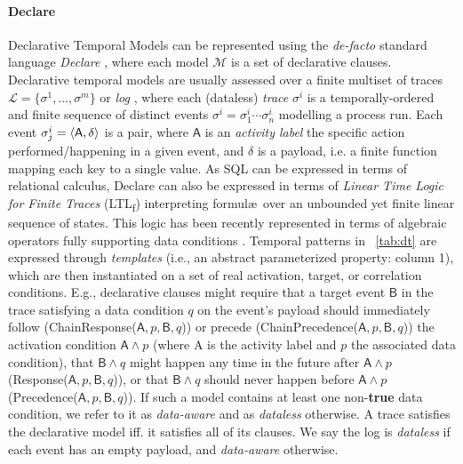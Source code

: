 \documentclass[acmengage]{acmart}
\newcommand{\LTLf}{\textup{LTL}\textsubscript{f}\xspace}
\begin{document}
\paragraph*{Declare} Declarative Temporal Models can be represented using the \textit{de-facto} standard language \textit{Declare} \cite{4384001}, where each model $\mathcal{M}$ is a set of declarative clauses. Declarative temporal models are usually assessed over a finite multiset of traces $\mathcal{L}=\{\sigma^1,\dots,\sigma^m\}$ or \textit{log} \cite{info14030173}, where each (dataless) \textit{trace} $\sigma^i$ is a temporally-ordered and finite sequence of distinct events $\sigma^i=\sigma^i_1\cdots \sigma^i_n$ modelling a process run. Each event $\sigma^i_j=\braket{\textsf{A},\delta}$ is a pair, where $\textsf{A}$ is an \textit{activity label} the specific action performed/happening in a given event, and $\delta$ is a payload, i.e. a finite function mapping each key to a single value. As SQL can be expressed in terms of relational calculus, Declare can also be expressed in terms of \textit{Linear Time Logic for Finite Traces} (\LTLf) \cite{Li2020} interpreting formul\ae\, over an unbounded yet finite linear sequence of states. This logic has been recently represented in terms of algebraic operators fully supporting data conditions \cite{info14030173,10.1007/978-3-642-54862-8_24}.  %
Temporal patterns in \tablename~\ref{tab:dt} are expressed through \textit{templates} (i.e., an abstract parameterized property: column 1), which are then instantiated on a set of real activation, target, or correlation conditions. E.g., declarative clauses might require that a target event $\textsf{B}$ in the trace satisfying a data condition $q$ on the event's payload should immediately follow (\textsf{ChainResponse}($\textsf{A},p,\textsf{B},q$)) or precede (\textsf{ChainPrecedence}($\textsf{A},p,\textsf{B},q$)) the activation condition $\textsf{A}\wedge p$ (where \textsf{A} is the activity label and $p$ the associated data condition), that $\textsf{B}\wedge q$ might happen any time in the future after $\textsf{A}\wedge p$ (\textsf{Response}($\textsf{A},p,\textsf{B},q$)), or that $\textsf{B}\wedge q$ should never
happen before $\textsf{A}\wedge p$ (\textsf{Precedence}($\textsf{A},p,\textsf{B},q$)). If such a model contains at least one non-\textbf{true} data condition, we refer to it as \textit{data-aware} and as \textit{dataless} otherwise.  A trace satisfies the declarative model iff. it satisfies all of its clauses. We say the log is \textit{dataless} if each event has an empty payload, and \textit{data-aware} otherwise.
\end{document}
